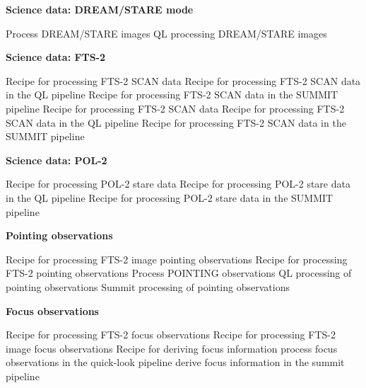 \documentclass[twoside,11pt,nolof]{starlink}
\begin{document}
\begin{small}
{\large
\begin{center}
\textbf{Science data: DREAM/STARE mode}
\end{center}
}
\begin{description}
Process DREAM/STARE images
QL processing DREAM/STARE images
\end{description}

{\large
\begin{center}
\textbf{Science data: FTS-2}
\end{center}
}
\begin{description}
Recipe for processing FTS-2 SCAN data
Recipe for processing FTS-2 SCAN data in the QL pipeline
Recipe for processing FTS-2 SCAN data in the SUMMIT pipeline
Recipe for processing FTS-2 SCAN data
Recipe for processing FTS-2 SCAN data in the QL pipeline
Recipe for processing FTS-2 SCAN data in the SUMMIT pipeline
\end{description}

{\large
\begin{center}
\textbf{Science data: POL-2}
\end{center}
}
\begin{description}
Recipe for processing POL-2 stare data
Recipe for processing POL-2 stare data in the QL pipeline
Recipe for processing POL-2 stare data in the SUMMIT pipeline
\end{description}

{\large
\begin{center}
\textbf{Pointing observations}
\end{center}
}
\begin{description}
Recipe for processing FTS-2 image pointing observations
Recipe for processing FTS-2 pointing observations
Process POINTING observations
QL processing of pointing observations
Summit processing of pointing observations
\end{description}

{\large
\begin{center}
\textbf{Focus observations}
\end{center}
}
\begin{description}
Recipe for processing FTS-2 focus observations
Recipe for processing FTS-2 image focus observations
Recipe for deriving focus information
process focus observations in the quick-look pipeline
derive focus information in the summit pipeline
\end{description}


\end{small}
\end{document}

